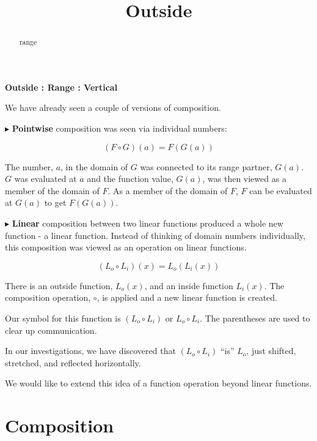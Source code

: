 \documentclass{ximera}
\title{Outside}
\begin{document}
\begin{abstract}
range
\end{abstract}
\maketitle







\textbf{\textcolor{blue!55!black}{Outside : Range : Vertical}}



We have already seen a couple of versions of composition. 

$\blacktriangleright$ \textbf{\textcolor{purple!85!blue}{Pointwise}} composition was seen via individual numbers: 

\[ (F \circ G)(a) = F(G(a)) \]

The number, $a$, in the domain of $G$ was connected to its range partner, $G(a)$.  $G$ was evaluated at $a$ and the function value, $G(a)$, was then viewed as a member of the domain of $F$.  As a member of the domain of $F$, $F$ can be evaluated at $G(a)$ to get $F(G(a))$. 




$\blacktriangleright$ \textbf{\textcolor{purple!85!blue}{Linear}} composition between two linear functions produced a whole new function - a linear function.  Instead of thinking of domain numbers individually, this composition was viewed as an operation on linear functions.

\[    (L_o \circ L_i)(x) = L_o(L_i(x))  \]

There is an outside function, $L_o(x)$, and an inside function $L_i(x)$.  The composition operation, $\circ$, is applied and a new linear function is created.  



Our symbol for this function is $(L_o \circ L_i)$ or $L_o \circ L_i$.  The parentheses are used to clear up communication.

In our investigations, we have discovered that $(L_o \circ L_i)$ ``is'' $L_o$, just shifted, stretched, and reflected horizontally.


We would like to extend this idea of a function operation beyond linear functions.





\section*{Composition}
\end{document}
